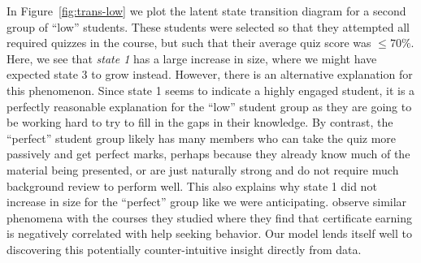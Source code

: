 In Figure~\ref{fig:trans-low} we plot the latent state transition diagram
for a second group of ``low'' students. These students were selected so
that they attempted all required quizzes in the course, but such that their
average quiz score was $\leq 70\%$. Here, we see that \emph{state 1} has a
large increase in size, where we might have expected state 3 to grow
instead.  However, there is an alternative explanation for this phenomenon.
Since state 1 seems to indicate a highly engaged student, it is a perfectly
reasonable explanation for the ``low'' student group as they are going to
be working hard to try to fill in the gaps in their knowledge. By contrast,
the ``perfect'' student group likely has many members who can take the quiz
more passively and get perfect marks, perhaps because they already know
much of the material being presented, or are just naturally strong and do
not require much background review to perform well. This also explains why
state 1 did not increase in size for the ``perfect'' group like we were
anticipating. \citet{Kizilcec:2017:CandE} observe similar phenomena with
the courses they studied where they find that certificate earning is
negatively correlated with help seeking behavior. Our model lends itself
well to discovering this potentially counter-intuitive insight directly
from data.
